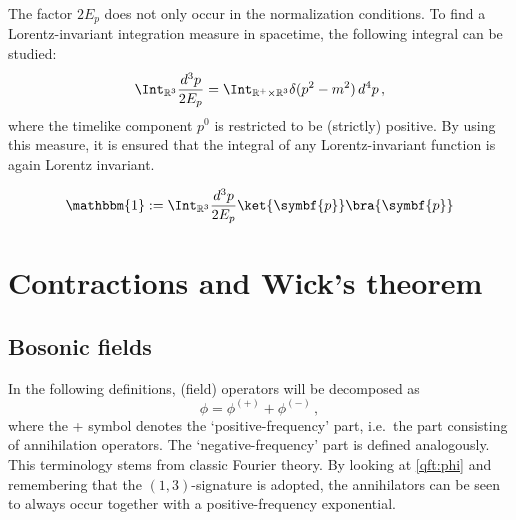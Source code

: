     The factor $2E_p$ does not only occur in the normalization conditions. To find a Lorentz-invariant integration measure in spacetime, the following integral can be studied:
    \begin{gather}
        \Int_{\mathbb{R}^3}\frac{d^3p}{2E_p} = \Int_{\mathbb{R}^+\times\mathbb{R}^3}\delta(p^2-m^2)\,d^4p\,,
    \end{gather}
    where the timelike component $p^0$ is restricted to be (strictly) positive. By using this measure, it is ensured that the integral of any Lorentz-invariant function is again Lorentz invariant.
    \begin{example}
        \begin{gather}
            \mathbbm{1} := \Int_{\mathbb{R}^3}\frac{d^3p}{2E_p}\ket{\symbf{p}}\bra{\symbf{p}}
        \end{gather}
    \end{example}

\section{Contractions and Wick's theorem}
\subsection{Bosonic fields}

    In the following definitions, (field) operators will be decomposed as \[\phi = \phi^{(+)} + \phi^{(-)}\,,\] where the + symbol denotes the `positive-frequency' part, i.e.~the part consisting of annihilation operators. The `negative-frequency' part is defined analogously. This terminology stems from classic Fourier theory. By looking at \cref{qft:phi} and remembering that the $(1,3)$-signature is adopted, the annihilators can be seen to always occur together with a positive-frequency exponential.


